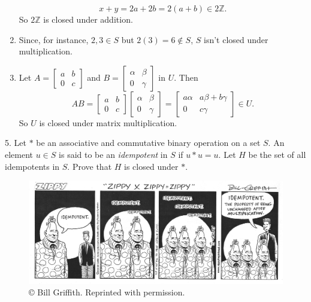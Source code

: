 \documentclass[10pt,]{book}
\theoremstyle{plain}
\theoremstyle{definition}
\theoremstyle{definition}
\theoremstyle{definition}
\theoremstyle{definition}
\numberwithin{equation}{section}
\def\Z{\mathbb{Z}}
\newcommand{\amp}{&}
\begin{document}
\begin{exerciselist}
\begin{enumerate}[label=(\alph*)]
\begin{equation*}
x+y=2a+2b=2(a+b)\in 2\Z.
\end{equation*}
So \(2\Z\) is closed under addition.%
\item\hypertarget{li-72}{}Since, for instance, \(2,3\in S\) but \(2(3)=6\not\in S\), \(S\) isn't closed under multiplication.%
\item\hypertarget{li-73}{}Let \(A=\begin{bmatrix}a \amp b \\ 0 \amp c\end{bmatrix}\) and \(B=\begin{bmatrix}\alpha \amp \beta \\ 0 \amp \gamma\end{bmatrix}\) in \(U\). Then%
\begin{equation*}
AB=
\begin{bmatrix}
a \amp  b \\
0 \amp  c
\end{bmatrix} 
\begin{bmatrix}
\alpha \amp  \beta \\
0 \amp  \gamma
\end{bmatrix} 
=
\begin{bmatrix}
a\alpha \amp  a\beta+b\gamma \\
0 \amp  c\gamma
\end{bmatrix} 
\in U.
\end{equation*}
So \(U\) is closed under matrix multiplication.%
\end{enumerate}
\item[5.]\hypertarget{exercise-11}{}Let \(*\) be an associative and commutative binary operation on a set \(S\). An element \(u\in S\) is said to be an \emph{idempotent} in \(S\) if \(u*u=u\). Let \(H\) be the set of all idempotents in \(S\). Prove that \(H\) is closed under \(*\).%
\begin{figure}
\centering
\includegraphics[width=1\linewidth]{zippy.png}
\caption{©  Bill Griffith. Reprinted with permission.\label{zip}}
\end{figure}

\end{exerciselist}
\end{document}
